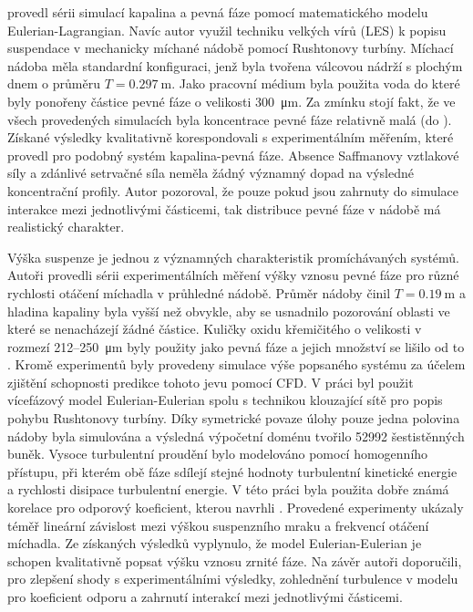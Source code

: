 \citet{derk03} provedl sérii simulací kapalina a pevná fáze pomocí matematického modelu Eulerian-Lagrangian. Navíc autor využil techniku velkých vírů (LES) k popisu suspendace v mechanicky míchané nádobě pomocí Rushtonovy turbíny. Míchací nádoba měla standardní konfiguraci, jenž byla tvořena válcovou nádrží s plochým dnem o průměru $T=\SI{0.297}{\meter}$. Jako pracovní médium byla použita voda do které byly ponořeny částice pevné fáze o velikosti \SI{300}{\micro\meter}. Za zmínku stojí fakt, že ve všech provedených simulacích byla koncentrace pevné fáze relativně malá (do ). Získané výsledky kvalitativně korespondovali s experimentálním měřením, které provedl \citet{miche03} pro podobný systém kapalina-pevná fáze. Absence Saffmanovy vztlakové síly a zdánlivé setrvačné síla neměla žádný významný dopad na výsledné koncentrační profily. Autor pozoroval, že pouze pokud jsou zahrnuty do simulace interakce mezi jednotlivými částicemi, tak distribuce pevné fáze v nádobě má realistický charakter. 

Výška suspenze je jednou z významných charakteristik promíchávaných systémů. Autoři \citet{mic04} provedli sérii experimentálních měření výšky vznosu pevné fáze pro různé rychlosti otáčení míchadla v průhledné nádobě. Průměr nádoby činil $T=\SI{0.19}{\meter}$ a hladina kapaliny byla vyšší než obvykle, aby se usnadnilo pozorování oblasti ve které se nenacházejí žádné částice. Kuličky oxidu křemičitého o velikosti v rozmezí \num{212}--\SI{250}{\micro\meter} byly použity jako pevná fáze a jejich množství se lišilo od  to . Kromě experimentů byly provedeny simulace výše popsaného systému za účelem zjištění schopnosti predikce tohoto jevu pomocí CFD. V práci byl použit vícefázový model Eulerian-Eulerian spolu s technikou klouzající sítě pro popis pohybu Rushtonovy turbíny. Díky symetrické povaze úlohy pouze jedna polovina nádoby byla simulována a výsledná výpočetní doménu tvořilo \num{52992} šestistěnných buněk. Vysoce turbulentní proudění bylo modelováno pomocí homogenního \keps{} přístupu, při kterém obě fáze sdílejí stejné hodnoty turbulentní kinetické energie a rychlosti disipace turbulentní energie. V této práci byla použita dobře známá korelace pro odporový koeficient, kterou navrhli \citet{schi32}. Provedené experimenty ukázaly téměř lineární závislost mezi výškou suspenzního mraku a frekvencí otáčení míchadla. Ze získaných výsledků vyplynulo, že model Eulerian-Eulerian je schopen kvalitativně popsat výšku vznosu zrnité fáze. Na závěr autoři doporučili, pro zlepšení shody s experimentálními výsledky, zohlednění turbulence v modelu pro koeficient odporu a zahrnutí interakcí mezi jednotlivými částicemi.

